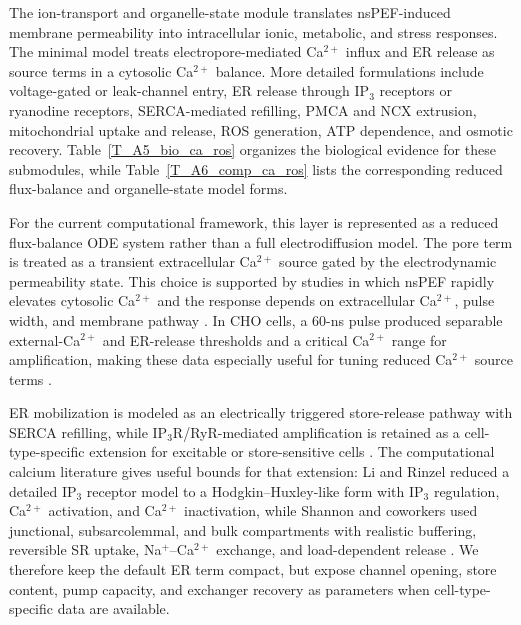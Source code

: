 \documentclass[Afour,sagev,times]{sagej}
\begin{document}
The ion-transport and organelle-state module translates nsPEF-induced membrane permeability into intracellular ionic, metabolic, and stress responses. The minimal model treats electropore-mediated Ca$^{2+}$ influx and ER release as source terms in a cytosolic Ca$^{2+}$ balance. More detailed formulations include voltage-gated or leak-channel entry, ER release through IP$_3$ receptors or ryanodine receptors, SERCA-mediated refilling, PMCA and NCX extrusion, mitochondrial uptake and release, ROS generation, ATP dependence, and osmotic recovery. Table~\ref{T_A5_bio_ca_ros} organizes the biological evidence for these submodules, while Table~\ref{T_A6_comp_ca_ros} lists the corresponding reduced flux-balance and organelle-state model forms.

For the current computational framework, this layer is represented as a reduced flux-balance ODE system rather than a full electrodiffusion model. The pore term is treated as a transient extracellular Ca$^{2+}$ source gated by the electrodynamic permeability state. This choice is supported by studies in which nsPEF rapidly elevates cytosolic Ca$^{2+}$ and the response depends on extracellular Ca$^{2+}$, pulse width, and membrane pathway \cite{vernier2003calcium,bagalkot2018membrane,yun2024modulating}. In CHO cells, a 60-ns pulse produced separable external-Ca$^{2+}$ and ER-release thresholds and a critical Ca$^{2+}$ range for amplification, making these data especially useful for tuning reduced Ca$^{2+}$ source terms \cite{semenov2013primary}.

ER mobilization is modeled as an electrically triggered store-release pathway with SERCA refilling, while IP$_3$R/RyR-mediated amplification is retained as a cell-type-specific extension for excitable or store-sensitive cells \cite{semenov2013recruitment,tolstykh2013activation,tolstykh2014pip2,wang2009cardiac,azarov2019excitation}. The computational calcium literature gives useful bounds for that extension: Li and Rinzel reduced a detailed IP$_3$ receptor model to a Hodgkin--Huxley-like form with IP$_3$ regulation, Ca$^{2+}$ activation, and Ca$^{2+}$ inactivation, while Shannon and coworkers used junctional, subsarcolemmal, and bulk compartments with realistic buffering, reversible SR uptake, Na$^+$--Ca$^{2+}$ exchange, and load-dependent release \cite{li1994equations,shannon2004mathematical}. We therefore keep the default ER term compact, but expose channel opening, store content, pump capacity, and exchanger recovery as parameters when cell-type-specific data are available.
\end{document}
